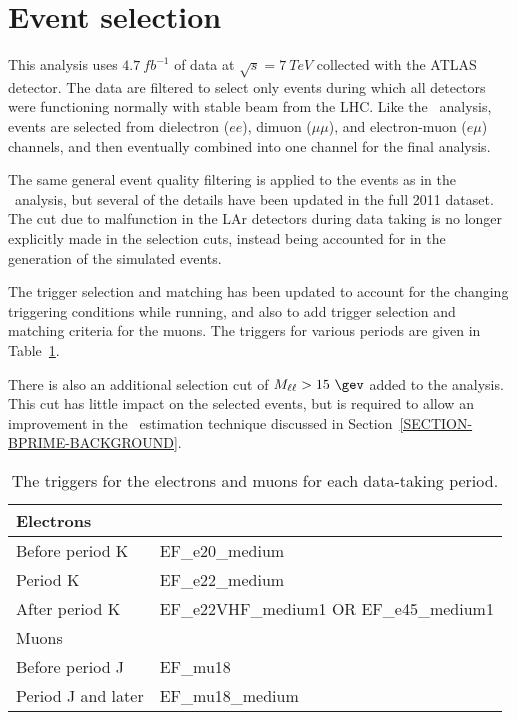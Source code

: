 \section{Event selection}
\label{SECTION-BPRIME-SELECTION}
This analysis uses $4.7\ fb^{-1}$ of data at $\sqrt{s}= 7\ TeV$ collected with the ATLAS detector. The data are filtered to select only events during which all detectors were functioning normally with stable beam from the LHC. Like the \Wt\ analysis, events are selected from dielectron ($ee$), dimuon ($\mu\mu$), and electron-muon ($e\mu$) channels, and then eventually combined into one channel for the final analysis. 

The same general event quality filtering is applied to the events as in the \Wt\ analysis, but several of the details have been updated in the full 2011 dataset. The cut due to malfunction in the LAr detectors during data taking is no longer explicitly made in the selection cuts, instead being accounted for in the generation of the simulated events. 

The trigger selection and matching has been updated to account for the changing triggering conditions while running, and also to add trigger selection and matching criteria for the muons. The triggers for various periods are given in Table~\ref{TABLE-BPRIME-TRIGGER}.

There is also an additional selection cut  of $M_{\ell\ell}>15~\gev$ added to the analysis. This cut has little impact on the selected events, but is required to allow an improvement in the \multijet\ estimation technique discussed in Section~\ref{SECTION-BPRIME-BACKGROUND}.

\begin{table}[htdp]
\begin{center}
\begin{tabular}{l|l}
\hline
Electrons &\\
\hline
Before period K & EF\_e20\_medium \\
Period K & EF\_e22\_medium \\
After period K & EF\_e22VHF\_medium1 OR EF\_e45\_medium1\\
\hline\hline
Muons &\\
\hline
Before period J & EF\_mu18 \\
Period J and later & EF\_mu18\_medium\\
\hline
\end{tabular}
\caption{The triggers for the electrons and muons for each data-taking period.}
\label{TABLE-BPRIME-TRIGGER}
\end{center}
\end{table}


